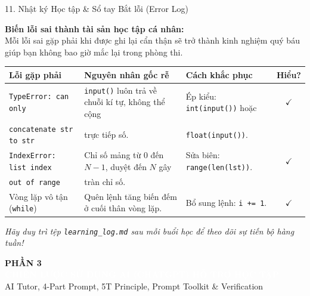 \documentclass[aspectratio=169, 10pt]{beamer}
\begin{document}
\begin{frame}{11. Nhật ký Học tập \& Sổ tay Bắt lỗi (Error Log)}
  \begin{tcolorbox}[colback=secondarygreen!8, colframe=secondarygreen, arc=3pt, left=8pt, right=8pt, top=3pt, bottom=3pt]
    \textbf{\footnotesize Biến lỗi sai thành tài sản học tập cá nhân:} \\
    \footnotesize Mỗi lỗi sai gặp phải khi được ghi lại cẩn thận sẽ trở thành kinh nghiệm quý báu giúp bạn không bao giờ mắc lại trong phòng thi.
  \end{tcolorbox}
  \vspace{0.1cm}
  \scriptsize
  \begin{tabularx}{\textwidth}{l X X c}
    \toprule
    \textbf{Lỗi gặp phải} & \textbf{Nguyên nhân gốc rễ} & \textbf{Cách khắc phục} & \textbf{Hiểu?} \\
    \midrule
    \texttt{TypeError: can only} & \texttt{input()} luôn trả về chuỗi kí tự, không thể cộng & Ép kiểu: \texttt{int(input())} hoặc & $\checkmark$ \\
    \texttt{concatenate str to str} & trực tiếp số. & \texttt{float(input())}. & \\
    \midrule
    \texttt{IndexError: list index} & Chỉ số mảng từ $0$ đến $N-1$, duyệt đến $N$ gây & Sửa biên: \texttt{range(len(lst))}. & $\checkmark$ \\
    \texttt{out of range} & tràn chỉ số. & & \\
    \midrule
    Vòng lặp vô tận (\texttt{while}) & Quên lệnh tăng biến đếm ở cuối thân vòng lặp. & Bổ sung lệnh: \texttt{i += 1}. & $\checkmark$ \\
    \bottomrule
  \end{tabularx}
  \vspace{0.15cm}
  \centering\footnotesize\itshape
  Hãy duy trì tệp \texttt{learning\_log.md} sau mỗi buổi học để theo dõi sự tiến bộ hàng tuần!
\end{frame}

\begin{frame}[plain]
  \vfill
  \begin{tcolorbox}[colback=accentorange, colframe=accentorange, arc=5pt, left=15pt, right=15pt, top=15pt, bottom=15pt]
    \textcolor{primaryblue}{\large\textbf{PHẦN 3}}\\[4pt]
    {\LARGE\textbf{\textcolor{white}{CHIẾN LƯỢC SỬ DỤNG AI (CHATGPT) HỖ TRỢ HỌC TẬP}}}\\[6pt]
    \textcolor{white!90}{\small AI Tutor, 4-Part Prompt, 5T Principle, Prompt Toolkit \& Verification}
  \end{tcolorbox}
  \vfill
\end{frame}
\end{document}
